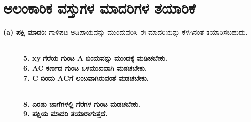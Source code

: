 \section{ಅಲಂಕಾರಿಕ ವಸ್ತುಗಳ ಮಾದರಿಗಳ ತಯಾರಿಕೆ}\label{sec2.3}%

\textbf{(a) ಪಕ್ಷಿ ಮಾದರಿ:} ಗಾಳಿಪಟ ಅಡಿಪಾಯವನ್ನು ಮುಂದುವರಿಸಿ ಈ ಮಾದರಿಯನ್ನು ಕೆಳಗಿನಂತೆ ತಯಾರಿಸಬಹುದು.
\begin{figure}[H]
\\
\textbf{5. xy ಗೆರೆಯ ಗುಂಟ A ಬಿಂದುವನ್ನು ಮುಂದಕ್ಕೆ ಮಡಿಚಬೇಕು.}\\
\textbf{6. AC ಕರ್ಣದ ಗುಂಟ ಒಳಮುಖವಾಗಿ ಮಡಚಬೇಕು.}\\
\textbf{7. C ಬಿಂದು ACಗೆ ಲಂಬವಾಗಿರುವಂತೆ ಮಡಚಬೇಕು.}
\end{figure}
\begin{figure}[H]
\\
\textbf{8. ಎರಡು ಜಾಗೆಗಳಲ್ಲಿ ಗೆರೆಗಳ ಗುಂಟ ಮಡಚಬೇಕು.}\\
\textbf{9. ಪಕ್ಷಿಯ ಮಾದರಿ ತಯಾರಾಗುತ್ತದೆ.}
\end{figure}

